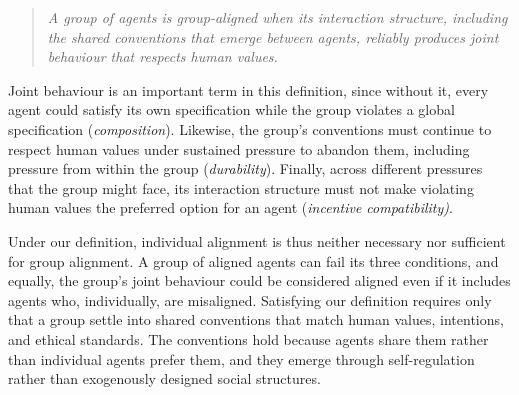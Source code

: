 \begin{quote}
\textit{A group of agents is group-aligned when its interaction structure, including the shared conventions that emerge between agents, reliably produces joint behaviour that respects human values.}
\end{quote}

Joint behaviour is an important term in this definition, since without it, every agent could satisfy its own specification while the group violates a global specification (\textit{composition}). Likewise, the group’s conventions must continue to respect human values under sustained pressure to abandon them, including pressure from within the group (\textit{durability}). Finally, across different pressures that the group might face, its interaction structure must not make violating human values the preferred option for an agent (\textit{incentive compatibility)}.

Under our definition, individual alignment is thus neither necessary nor sufficient for group alignment. A group of aligned agents can fail its three conditions, and equally, the group’s joint behaviour could be considered aligned even if it includes agents who, individually, are misaligned. Satisfying our definition requires only that a group settle into shared conventions that match human values, intentions, and ethical standards. The conventions hold because agents share them rather than individual agents prefer them, and they emerge through self-regulation rather than exogenously designed social structures.